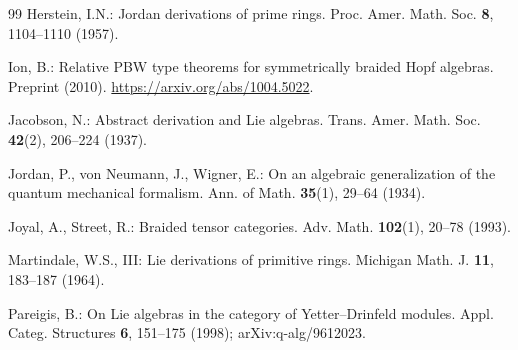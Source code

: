 \documentclass[]{interact}
\theoremstyle{plain}
\theoremstyle{definition}
\theoremstyle{remark}
\begin{document}
\begin{thebibliography}{99}
Herstein, I.N.: Jordan derivations of prime rings. Proc. Amer. Math. Soc. \textbf{8}, 1104--1110 (1957).

Ion, B.: Relative PBW type theorems for symmetrically braided Hopf algebras. Preprint (2010). \url{https://arxiv.org/abs/1004.5022}.

Jacobson, N.: Abstract derivation and Lie algebras. Trans. Amer. Math. Soc. \textbf{42}(2), 206--224 (1937).

Jordan, P., von Neumann, J., Wigner, E.: On an algebraic generalization of the quantum mechanical formalism. Ann. of Math. \textbf{35}(1), 29--64 (1934).

Joyal, A., Street, R.: Braided tensor categories. Adv. Math. \textbf{102}(1), 20--78 (1993).

Martindale, W.S., III: Lie derivations of primitive rings. Michigan Math. J. \textbf{11}, 183--187 (1964).

Pareigis, B.: On Lie algebras in the category of Yetter--Drinfeld modules. Appl. Categ. Structures \textbf{6}, 151--175 (1998); arXiv:q-alg/9612023.

\end{thebibliography}
\end{document}
